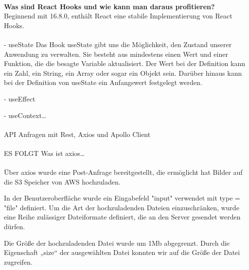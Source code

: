 \paragraph{}
\textbf{Was sind React Hooks und wie kann man daraus profitieren?}\\
Beginnend mit 16.8.0, enthält React eine stabile Implementierung von React Hooks.



\paragraph{}
- useState
Das Hook useState gibt uns die Möglichkeit, den Zustand unserer Anwendung zu verwalten. Sie besteht aus mindestens einen Wert und einer Funktion, die die besagte Variable aktualisiert.
Der Wert bei der Definition kann ein Zahl, ein String, ein Array oder sogar ein Objekt sein.
Darüber hinaus kann bei der Definition von useState ein Anfangswert festgelegt werden.

- useEffect


- useContext…

\paragraph{}
API Anfragen mit Rest, Axios und Apollo Client

\paragraph{}
ES FOLGT Was ist axios…

\paragraph{}
Über axios wurde eine Post-Anfrage bereitgestellt, die ermöglicht hat Bilder auf die S3 Speicher von AWS hochzuladen.

In der Benutzeroberfläche wurde ein Eingabefeld "input" verwendet mit type = "file" definiert.
Um die Art der hochzuladenden Dateien einzuschränken, wurde eine Reihe zulässiger Dateiformate definiert, die an den Server gesendet werden dürfen.


Die Größe der hochzuladenden Datei wurde um 1Mb abgegrenzt.
Durch die Eigenschaft „size“ der ausgewählten Datei konnten wir auf die Größe der Datei zugreifen.

